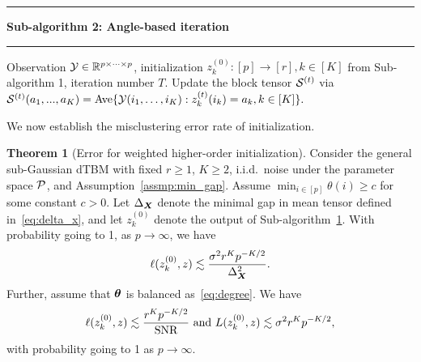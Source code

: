 \documentclass[journal]{IEEEtran}
\theoremstyle{definition}
\newtheorem{thm}{Theorem}
\theoremstyle{definition}
\newcommand\Algphase[1]{%
\vspace*{-.7\baselineskip}\Statex\hspace*{\dimexpr-\algorithmicindent-2pt\relax}\rule{\textwidth}{0.4pt}%
\Statex\hspace*{-\algorithmicindent}\textbf{#1}%
\vspace*{-.7\baselineskip}\Statex\hspace*{\dimexpr-\algorithmicindent-2pt\relax}\rule{\textwidth}{0.4pt}%
}
\begin{document}
\begin{algorithm*}[th!]
\begin{algorithmic}[1]
\Algphase{Sub-algorithm 2: Angle-based iteration}\label{alg:2}
\INPUT Observation $\mathcal{Y} \in \mathbb{R}^{p \times \cdots \times p}$, initialization $z^{(0)}_k \colon [p]\to[r], k \in [K]$ from Sub-algorithm 1, iteration number $T$.
\State Update the block tensor $\mathcal{S}^{(t)}$ via
$\mathcal{S}^{(t)} (a_1,...,a_K)= \text{Ave} \{\mathcal{Y}(i_1,\ldots,i_K): z^{(t)}_k(i_k) = a_k, k \in [K]\}.$


\EndFor
\EndFor


\end{algorithmic}
\end{algorithm*}

We now establish the misclustering error rate of initialization.

\begin{thm}[Error for weighted higher-order initialization]\label{thm:initial} Consider the general sub-Gaussian dTBM with {fixed $r \geq 1$, $K \geq 2$}, i.i.d.\ noise under the parameter space $\mathcal{P}$, and Assumption~\ref{assmp:min_gap}. Assume $\min_{i\in[p]}\theta(i) \geq c$ for some constant $c>0$. Let $\Delta_{\bm X}$ denote the minimal gap in mean tensor defined in~\eqref{eq:delta_x}, and let $ z^{(0)}_k$ denote the output of Sub-algorithm~\hyperref[alg:main]{1}. With probability going to 1, {as $p \rightarrow \infty$}, we have
\begin{equation}
    \ell(z^{(0)}_k, z) \lesssim {\sigma^2 r^K p^{-K/2}\over \Delta_{\bm X}^2}.
\end{equation}
Further, assume that $\boldsymbol{\theta}$ is balanced as~\eqref{eq:degree}. We have
\begin{equation}\label{eq:ini}
 \ell(z_k^{(0)}, z) \lesssim {r^K p^{-K/2}\over \text{SNR}} \  \text{and} \ L(z^{(0)}_k, z) \lesssim  {\sigma^2 r^K p^{-K/2}},
\end{equation}
{with probability going to 1 as $p \rightarrow \infty$.}
\end{thm}
\end{document}
